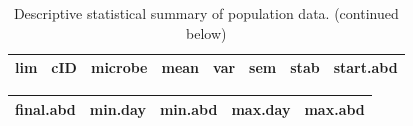 \documentclass[]{article}
\begin{document}
\begin{longtable}[]{@{}llllllll@{}}
\caption{Descriptive statistical summary of population data. (continued
below)}\tabularnewline
\toprule
\begin{minipage}[t]{0.08\columnwidth}\raggedright\strut
\textbf{lim}\strut
\end{minipage} & \begin{minipage}[t]{0.08\columnwidth}\raggedright\strut
\textbf{cID}\strut
\end{minipage} & \begin{minipage}[t]{0.13\columnwidth}\raggedright\strut
\textbf{microbe}\strut
\end{minipage} & \begin{minipage}[t]{0.09\columnwidth}\raggedright\strut
\textbf{mean}\strut
\end{minipage} & \begin{minipage}[t]{0.08\columnwidth}\raggedright\strut
\textbf{var}\strut
\end{minipage} & \begin{minipage}[t]{0.08\columnwidth}\raggedright\strut
\textbf{sem}\strut
\end{minipage} & \begin{minipage}[t]{0.09\columnwidth}\raggedright\strut
\textbf{stab}\strut
\end{minipage} & \begin{minipage}[t]{0.14\columnwidth}\raggedright\strut
\textbf{start.abd}\strut
\end{minipage}\tabularnewline
\bottomrule
\end{longtable}

\begin{longtable}[]{@{}lllll@{}}
\toprule
\begin{minipage}[t]{0.17\columnwidth}\raggedright\strut
\textbf{final.abd}\strut
\end{minipage} & \begin{minipage}[t]{0.14\columnwidth}\raggedright\strut
\textbf{min.day}\strut
\end{minipage} & \begin{minipage}[t]{0.14\columnwidth}\raggedright\strut
\textbf{min.abd}\strut
\end{minipage} & \begin{minipage}[t]{0.14\columnwidth}\raggedright\strut
\textbf{max.day}\strut
\end{minipage} & \begin{minipage}[t]{0.14\columnwidth}\raggedright\strut
\textbf{max.abd}\strut
\end{minipage}\tabularnewline
\bottomrule
\end{longtable}
\end{document}
